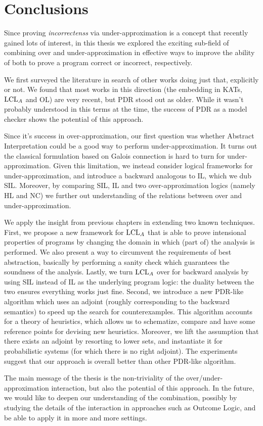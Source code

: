 
\chapter{Conclusions}\label{ch:conclusions}
Since proving \emph{incorrectenss} via under-approximation is a concept that recently gained lots of interest, in this thesis we explored the exciting sub-field of combining over and under-approximation in effective ways to improve the ability of both to prove a program correct or incorrect, respectively.

We first surveyed the literature in search of other works doing just that, explicitly or not. We found that most works in this direction (the embedding in KATs, $\text{LCL}_A$ and OL) are very recent, but PDR stood out as older. While it wasn't probably understood in this terms at the time, the success of PDR as a model checker shows the potential of this approach.

Since it's success in over-approximation, our first question was whether Abstract Interpretation could be a good way to perform under-approximation. It turns out the classical formulation based on Galois connection is hard to turn for under-approximation. Given this limitation, we instead consider logical frameworks for under-approximation, and introduce a backward analogous to IL, which we dub SIL. Moreover, by comparing SIL, IL and two over-approximation logics (namely HL and NC) we further out understanding of the relations between over and under-approximation.

We apply the insight from previous chapters in extending two known techniques.
First, we propose a new framework for $\text{LCL}_A$ that is able to prove intensional properties of programs by changing the domain in which (part of) the analysis is performed. We also present a way to circumvent the requirements of best abstraction, basically by performing a sanity check which guarantees the soundness of the analysis. Lastly, we turn $\text{LCL}_A$ over for backward analysis by using SIL instead of IL as the underlying program logic: the duality between the two ensures everything works just fine.
Second, we introduce a new PDR-like algorithm which uses an adjoint (roughly corresponding to the backward semantics) to speed up the search for counterexamples. This algorithm accounts for a theory of heuristics, which allows us to schematize, compare and have some reference points for devising new heuristics. Moreover, we lift the assumption that there exists an adjoint by resorting to lower sets, and instantiate it for probabilistic systems (for which there is no right adjoint). The experiments suggest that our approach is overall better than other PDR-like algorithm.

\fromhere
The main message of the thesis is the non-triviality of the over/under-approximation interaction, but also the potential of this approach.
In the future, we would like to deepen our understanding of the combination, possibly by studying the details of the interaction in approaches such as Outcome Logic, and be able to apply it in more and more settings.
